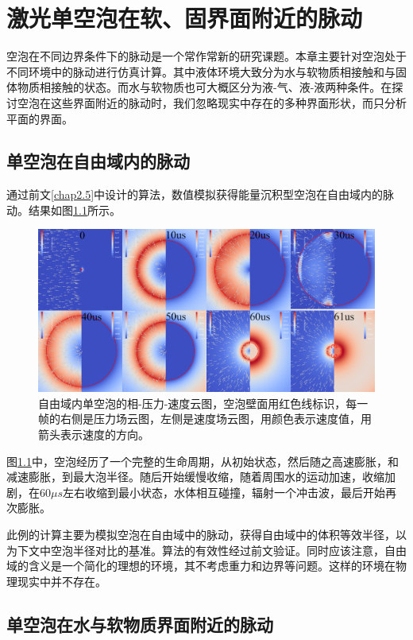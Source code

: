 \chapter{激光单空泡在软、固界面附近的脉动}


空泡在不同边界条件下的脉动是一个常作常新的研究课题。本章主要针对空泡处于不同环境中的脉动进行仿真计算。其中液体环境大致分为水与软物质相接触和与固体物质相接触的状态。而水与软物质也可大概区分为液-气、液-液两种条件。在探讨空泡在这些界面附近的脉动时，我们忽略现实中存在的多种界面形状，而只分析平面的界面。

 \section{单空泡在自由域内的脉动}
通过前文\ref{chap2.5}中设计的算法，数值模拟获得能量沉积型空泡在自由域内的脉动。结果如图\ref{fig3.single}所示。
\begin{figure}[h]
    \centering
    \includegraphics[width=0.9\linewidth]{img/fig3.single.png}
    \caption[自由域内单空泡的相-压力-速度云图]{自由域内单空泡的相-压力-速度云图，空泡壁面用红色线标识，每一帧的右侧是压力场云图，左侧是速度场云图，用颜色表示速度值，用箭头表示速度的方向。}
    \label{fig3.single}
\end{figure}

图\ref{fig3.single}中，空泡经历了一个完整的生命周期，从初始状态，然后随之高速膨胀，和减速膨胀，到最大泡半径。随后开始缓慢收缩，随着周围水的运动加速，收缩加剧，在$60\mu s $左右收缩到最小状态，水体相互碰撞，辐射一个冲击波，最后开始再次膨胀。

此例的计算主要为模拟空泡在自由域中的脉动，获得自由域中的体积等效半径，以为下文中空泡半径对比的基准。算法的有效性经过前文验证。同时应该注意，自由域的含义是一个简化的理想的环境，其不考虑重力和边界等问题。这样的环境在物理现实中并不存在。


\section{单空泡在水与软物质界面附近的脉动}



